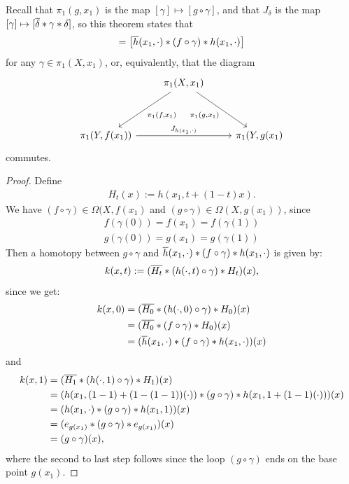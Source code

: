 Recall that $\pi_{1}(g, x_1)$ is the map $[\gamma] \mapsto [g \circ \gamma]$, and that $J_\delta$ is the map $[\gamma] \mapsto [\overline{{\delta}} * \gamma * \delta]$, so this theorem states that
\begin{align*}
	[g \circ \gamma] = \lr[\ol h(x_1,\cdot) * (f \circ \gamma) * h(x_1,\cdot)]
\end{align*}
for any $\gamma \in \pi_1(X,x_1)$, or, equivalently, that the diagram
\[\begin{tikzcd}
	& {\pi_1(X,x_1)} &\\
	\\
	{\pi_1(Y,f(x_1))} &&  {\pi_1(Y,g(x_1)}
	\arrow["{\pi_{1}(f,x_1)}", from=1-2, to=3-1]
	\arrow["{\pi_{1}(g,x_1)}"', from=1-2, to=3-3]
	\arrow["{J_{h(x_1,\cdot)}}",  from=3-1, to=3-3]
\end{tikzcd}\]
commutes.
\begin{proof}
	Define
	\begin{align*}
		H_t(x) := h(x_1, t + (1-t)x).
	\end{align*}
	We have $(f \circ \gamma) \in \Omega(X, f(x_1)$ and $(g \circ \gamma) \in \Omega(X, g(x_1))$, since
	\begin{align*}
		f(\gamma(0)) = f(x_1) = f(\gamma(1))\\
		g(\gamma(0)) = g(x_1) = g(\gamma(1))
	\end{align*}
	Then a homotopy between $g \circ \gamma$ and $\overline{{h}}(x_1,\cdot) * (f \circ \gamma) * h(x_1,\cdot)$ is given by:
	\begin{align*}
		k(x,t) := (\overline{{H_t}} * (h(\cdot, t) \circ \gamma) * H_t)(x),
	\end{align*}
	since we get:
	\begin{align*}
		k(x,0)
		&=
		(\overline{{H_0}} * (h(\cdot, 0) \circ \gamma) * H_0)(x)\\
		&=
		(\overline{{H_0}} * (f \circ \gamma) * H_0)(x)\\
		&=
		(\overline{{h}}(x_1, \cdot) * (f \circ \gamma) * h(x_1, \cdot))(x)
	\end{align*}
	and
	\begin{align*}
		k(x,1)
		&=
		(\overline{{H_1}} * (h(\cdot, 1) \circ \gamma) * H_1)(x)\\
		&=
		({h(x_1,(1-1) + (1-(1-1))(\cdot))} * (g \circ \gamma) * h(x_1,1 + (1-1)(\cdot)))(x)\\
		&=
		({h(x_1,\cdot)} * (g \circ \gamma) * h(x_1,1))(x)\\
		&=
		({e_{g(x_1)}} * (g \circ \gamma) * e_{g(x_1)})(x)\\
		&=
		(g \circ \gamma)(x),
	\end{align*}
	where the second to last step follows since the loop $(g \circ \gamma)$ ends on the base point $g(x_1)$. 
\end{proof}
